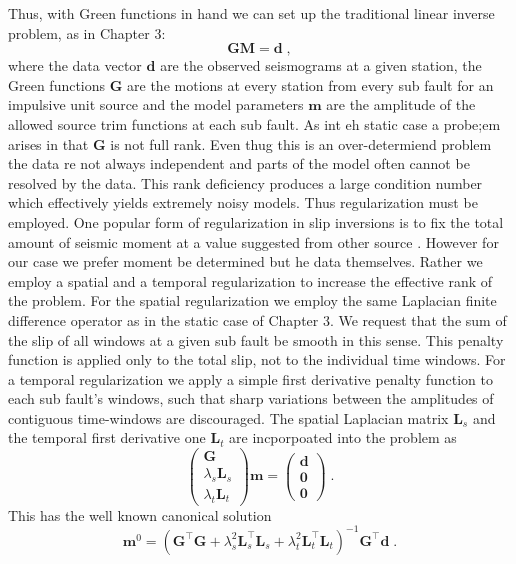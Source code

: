 Thus, with Green functions in hand we can set up the traditional linear inverse problem, as in Chapter 3:
\begin{equation}
\label{eq:inv}
\mathbf{GM}=\mathbf{d}\;,
\end{equation}
where the data vector $\mathbf{d}$ are the observed seismograms at a given station, the Green functions $\mathbf{G}$ are the motions at every station from every sub fault for an impulsive unit source and the model parameters $\mathbf{m}$ are the amplitude of the allowed source trim functions at each sub fault. 
As int eh static case a probe;em arises in that $\mathbf{G}$ is not full rank. Even thug this is an over-determiend problem the data re not always independent and parts of the model often cannot be resolved by the data. This rank deficiency produces a large condition number which effectively yields extremely noisy models. Thus regularization must be employed. One popular form of regularization in slip inversions is to fix the total amount of seismic moment at a value suggested from other source \citep{ji2002b}. However for our case we prefer moment be determined but he data themselves. Rather we employ a spatial and a temporal regularization to increase the effective rank of the problem. For the spatial regularization we employ the same Laplacian finite difference operator as in the static case of Chapter 3. We request that the sum of the slip of all windows at a given sub fault be smooth in this sense. This penalty function is applied only to the total slip, not to the individual time windows. For a temporal regularization we apply a simple first derivative penalty function to each sub fault's windows, such that sharp variations between the amplitudes of contiguous time-windows are discouraged. The spatial Laplacian matrix $\mathbf{L}_s$ and the temporal first derivative one $\mathbf{L}_t$ are incporpoated into the problem as
\begin{equation}
\left(\begin{matrix}
\mathbf{G}\\
\lambda_s\mathbf{L}_s\\ 
\lambda_t\mathbf{L}_t
\end{matrix}\right)
\mathbf{m}=
\left(\begin{matrix}
\mathbf{d}\\
\mathbf{0}\\ 
\mathbf{0}
\end{matrix}\right)\;.
\end{equation}
This has the well known canonical solution \citep{menke2012}
\begin{equation}
\label{eq:solution}
\mathbf{m}^0=
(\mathbf{G}^\top\mathbf{G}+\lambda_s^2\mathbf{L}_s^\top\mathbf{L}_s+\lambda_t^2\mathbf{L}_t^\top\mathbf{L}_t)^{-1}
\mathbf{G}^\top\mathbf{d}\;.
\end{equation}

